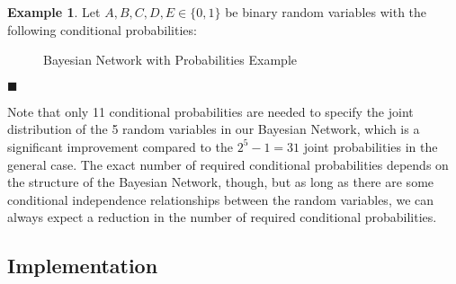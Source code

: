\documentclass{article}
\theoremstyle{definition}
\newtheorem{example}{Example}
\newenvironment{exampleqed}
    {\begin{example}}
    {\hfill \qedsymbol \end{example}}
\renewcommand{\qedsymbol}{\(\blacksquare\)}
\renewcommand{\P}{\mathbb{P}}
\begin{document}
\begin{exampleqed}
    Let \(A, B, C, D, E \in \{0, 1\}\) be binary random variables with the following conditional probabilities:

    \begin{figure}[htbp]
        \centering
        \caption{Bayesian Network with Probabilities Example}
        \label{fig:bayesian_network_probs}
    \end{figure}
\end{exampleqed}

Note that only 11 conditional probabilities are needed to specify the joint distribution of the 5 random variables in our Bayesian Network, which is a significant improvement compared to the \(2^5 - 1 = 31\) joint probabilities in the general case. The exact number of required conditional probabilities depends on the structure of the Bayesian Network, though, but as long as there are some conditional independence relationships between the random variables, we can always expect a reduction in the number of required conditional probabilities.

\subsection{Implementation} \label{sec:bn_implementation}
\end{document}
